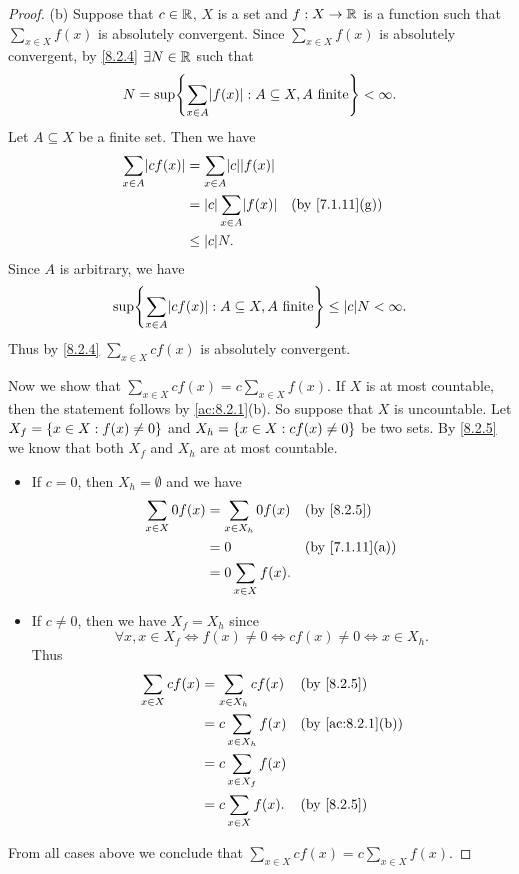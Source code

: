 \begin{proof}{(b)}
  Suppose that \(c \in \mathbb{R}\), \(X\) is a set and \(f : X \to \mathbb{R}\) is a function such that \(\sum_{x \in X} f(x)\) is absolutely convergent.
  Since \(\sum_{x \in X} f(x)\) is absolutely convergent, by \cref{8.2.4} \(\exists N \in \mathbb{R}\) such that
  \[
    N = \sup\set{\sum_{x \in A} \abs{f(x)} : A \subseteq X, A \text{ finite}} < \infty.
  \]
  Let \(A \subseteq X\) be a finite set.
  Then we have
  \begin{align*}
    \sum_{x \in A} \abs{cf(x)} & = \sum_{x \in A} \abs{c}\abs{f(x)}                                   \\
                               & = \abs{c}\sum_{x \in A} \abs{f(x)} &  & \text{(by \cref{7.1.11}(g))} \\
                               & \leq \abs{c} N.
  \end{align*}
  Since \(A\) is arbitrary, we have
  \[
    \sup\set{\sum_{x \in A} \abs{cf(x)} : A \subseteq X, A \text{ finite}} \leq \abs{c}N < \infty.
  \]
  Thus by \cref{8.2.4} \(\sum_{x \in X} cf(x)\) is absolutely convergent.

  Now we show that \(\sum_{x \in X} cf(x) = c \sum_{x \in X} f(x)\).
  If \(X\) is at most countable, then the statement follows by \cref{ac:8.2.1}(b).
  So suppose that \(X\) is uncountable.
  Let \(X_f = \left\lbrace x \in X : f(x) \neq 0\right\rbrace\) and \(X_h = \left\lbrace x \in X : cf(x) \neq 0\right\rbrace\) be two sets.
  By \cref{8.2.5} we know that both \(X_f\) and \(X_h\) are at most countable.
  \begin{itemize}
    \item If \(c = 0\), then \(X_h = \emptyset\) and we have
          \begin{align*}
            \sum_{x \in X} 0f(x) & = \sum_{x \in X_h} 0f(x) &  & \by{8.2.5}                   \\
                                 & = 0                      &  & \text{(by \cref{7.1.11}(a))} \\
                                 & = 0 \sum_{x \in X} f(x).
          \end{align*}
    \item If \(c \neq 0\), then we have \(X_f = X_h\) since
          \[
            \forall x, x \in X_f \iff f(x) \neq 0 \iff cf(x) \neq 0 \iff x \in X_h.
          \]
          Thus
          \begin{align*}
            \sum_{x \in X} cf(x) & = \sum_{x \in X_h} cf(x)  &  & \by{8.2.5}                     \\
                                 & = c \sum_{x \in X_h} f(x) &  & \text{(by \cref{ac:8.2.1}(b))} \\
                                 & = c \sum_{x \in X_f} f(x)                                     \\
                                 & = c \sum_{x \in X} f(x).  &  & \by{8.2.5}
          \end{align*}
  \end{itemize}
  From all cases above we conclude that \(\sum_{x \in X} cf(x) = c \sum_{x \in X} f(x)\).
\end{proof}

